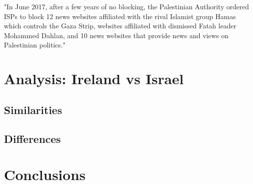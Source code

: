 "In June 2017, after a few years of no blocking, the Palestinian Authority ordered ISPs to block 12 news websites affiliated with the rival Islamist group Hamas which controls the Gaza Strip, websites affiliated with dismissed Fatah leader Mohammed Dahlan, and 10 news websites that provide news and views on Palestinian politics." \cite{zittrain2017shifting}


\section{Analysis: Ireland vs Israel}


\subsection{Similarities}



\subsection{Differences}



\section{Conclusions}

